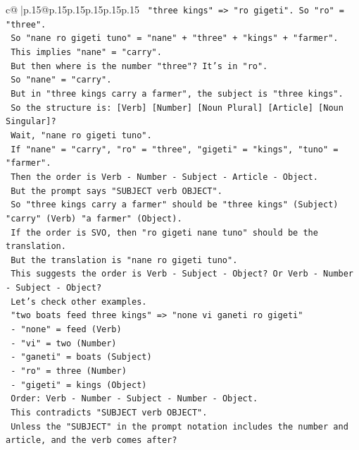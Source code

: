 \documentclass{article}
\begin{document}
{\begin{supertabular}{c@{$\;$}|p{.15\linewidth}@{}p{.15\linewidth}p{.15\linewidth}p{.15\linewidth}p{.15\linewidth}p{.15\linewidth}}
{{{\texttt{   "three kings" => "ro gigeti". So "ro" = "three".} \\
\texttt{   So "nane ro gigeti tuno" = "nane" + "three" + "kings" + "farmer".} \\
\texttt{   This implies "nane" = "carry".} \\
\texttt{   But then where is the number "three"? It's in "ro".} \\
\texttt{   So "nane" = "carry".} \\
\texttt{   But in "three kings carry a farmer", the subject is "three kings".} \\
\texttt{   So the structure is: {[}Verb{]} {[}Number{]} {[}Noun Plural{]} {[}Article{]} {[}Noun Singular{]}?} \\
\texttt{   Wait, "nane ro gigeti tuno".} \\
\texttt{   If "nane" = "carry", "ro" = "three", "gigeti" = "kings", "tuno" = "farmer".} \\
\texttt{   Then the order is Verb {-} Number {-} Subject {-} Article {-} Object.} \\
\texttt{   But the prompt says "SUBJECT verb OBJECT".} \\
\texttt{   So "three kings carry a farmer" should be "three kings" (Subject) "carry" (Verb) "a farmer" (Object).} \\
\texttt{   If the order is SVO, then "ro gigeti nane tuno" should be the translation.} \\
\texttt{   But the translation is "nane ro gigeti tuno".} \\
\texttt{   This suggests the order is Verb {-} Subject {-} Object? Or Verb {-} Number {-} Subject {-} Object?} \\
\texttt{   Let's check other examples.} \\
\texttt{   "two boats feed three kings" => "none vi ganeti ro gigeti"} \\
\texttt{   {-} "none" = feed (Verb)} \\
\texttt{   {-} "vi" = two (Number)} \\
\texttt{   {-} "ganeti" = boats (Subject)} \\
\texttt{   {-} "ro" = three (Number)} \\
\texttt{   {-} "gigeti" = kings (Object)} \\
\texttt{   Order: Verb {-} Number {-} Subject {-} Number {-} Object.} \\
\texttt{   This contradicts "SUBJECT verb OBJECT".} \\
\texttt{   Unless the "SUBJECT" in the prompt notation includes the number and article, and the verb comes after?} \\
}}}
\end{supertabular}}
\end{document}
